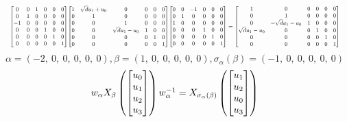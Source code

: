 \documentclass[11pt]{article}
\theoremstyle{definition}
\begin{document}
\[
\scaletoalign{\textwidth}{{\left[\begin{matrix}0 & 0 & 1 & 0 & 0 & 0\\0 & 1 & 0 & 0 & 0 & 0\\-1 & 0 & 0 & 0 & 0 & 0\\0 & 0 & 0 & 1 & 0 & 0\\0 & 0 & 0 & 0 & 1 & 0\\0 & 0 & 0 & 0 & 0 & 1\end{matrix}\right]} {\left[\begin{matrix}1 & \sqrt{d} u_{1} + u_{0} & 0 & 0 & 0 & 0\\0 & 1 & 0 & 0 & 0 & 0\\0 & 0 & 1 & 0 & 0 & 0\\0 & 0 & \sqrt{d} u_{1} - u_{0} & 1 & 0 & 0\\0 & 0 & 0 & 0 & 1 & 0\\0 & 0 & 0 & 0 & 0 & 1\end{matrix}\right]} {\left[\begin{matrix}0 & 0 & -1 & 0 & 0 & 0\\0 & 1 & 0 & 0 & 0 & 0\\1 & 0 & 0 & 0 & 0 & 0\\0 & 0 & 0 & 1 & 0 & 0\\0 & 0 & 0 & 0 & 1 & 0\\0 & 0 & 0 & 0 & 0 & 1\end{matrix}\right]} = {\left[\begin{matrix}1 & 0 & 0 & 0 & 0 & 0\\0 & 1 & 0 & 0 & 0 & 0\\0 & - \sqrt{d} u_{1} - u_{0} & 1 & 0 & 0 & 0\\\sqrt{d} u_{1} - u_{0} & 0 & 0 & 1 & 0 & 0\\0 & 0 & 0 & 0 & 1 & 0\\0 & 0 & 0 & 0 & 0 & 1\end{matrix}\right]}}
\]
\[
\alpha = \left( -2, \  0, \  0, \  0, \  0, \  0\right), \beta = \left( 1, \  0, \  0, \  0, \  0, \  0\right), \sigma_{\alpha}(\beta) = \left( -1, \  0, \  0, \  0, \  0, \  0\right)
\]
\[
\scaletoalign{\textwidth}{w_{\alpha} X_{\beta}\left(\left[\begin{matrix}u_{0}\\u_{1}\\u_{2}\\u_{3}\end{matrix}\right]\right) w_{\alpha}^{-1} = X_{\sigma_{\alpha}\left(\beta\right)}\left(\left[\begin{matrix}u_{1}\\u_{2}\\u_{0}\\u_{3}\end{matrix}\right]\right)}
\]
\end{document}
